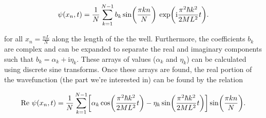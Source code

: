 \documentclass[11pt]{article}
\begin{document}
\begin{equation}
\psi(x_n,t) = {1\over N}
              \sum_{k=1}^{N-1} b_k \sin \biggl( {\pi k n\over N} \biggr)\>
              \exp \biggl( \text{i}{\pi^2\hbar k^2\over2ML^2} t \biggr).
              \end{equation}

for all \(x_n = \frac{nL}{N}\) along the length of the the well.
Furthermore, the coefficients \(b_k\) are complex and can be expanded to
separate the real and imaginary components such that
\(b_k = \alpha_k + \text{i}\eta_k.\) These arrays of values
(\(\alpha_k\) and \(\eta_k\)) can be calculated using discrete sine
transforms. Once these arrays are found, the real portion of the
wavefunction (the part we're interested in) can be found by the relation

\begin{equation}
\text{Re}\ \psi(x_n,t) = {1\over N} \sum_{k=1}^{N-1}
            \biggl[ \alpha_k \cos \biggl( {\pi^2\hbar k^2\over2ML^2} t \biggr)
            - \eta_k \sin \biggl( {\pi^2\hbar k^2\over2ML^2} t \biggr) \biggr]
            \sin \biggl( {\pi k n\over N} \biggr).
            \end{equation}
\end{document}
